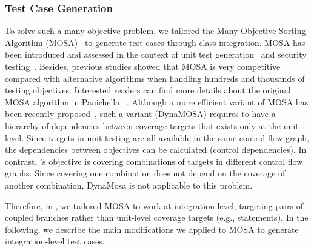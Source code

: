\subsubsection{Test Case Generation}
To solve such a many-objective problem, we tailored the Many-Objective Sorting Algorithm (MOSA)~\cite{Panichella2015} to generate test cases through class integration. MOSA has been introduced and assessed in the context of unit test generation~\cite{Panichella2015} and security testing~\cite{jan2019search}. Besides, previous studies \cite{Campos2018, Panichella2015} showed that MOSA is very competitive compared with alternative algorithms when handling hundreds and thousands of testing objectives. Interested readers can find more details about the original MOSA algorithm in Panichella \etal~\cite{Panichella2015}. Although a more efficient variant of MOSA has been recently proposed~\cite{Panichella2018}, such a variant (DynaMOSA) requires to have a hierarchy of dependencies between coverage targets that exists only at the unit level. Since targets in unit testing are all available in the same control flow graph, the dependencies between objectives can be calculated (\ie control dependencies). In contrast, \cling's objective is covering combinations of targets in different control flow graphs. Since covering one combination does not depend on the coverage of another combination, DynaMosa is not applicable to this problem.

Therefore, in \integration, we tailored MOSA to work at integration level, targeting pairs of coupled branches rather than unit-level coverage targets (e.g., statements). In the following, we describe the main modifications we applied to MOSA to generate integration-level test cases.
 
%

